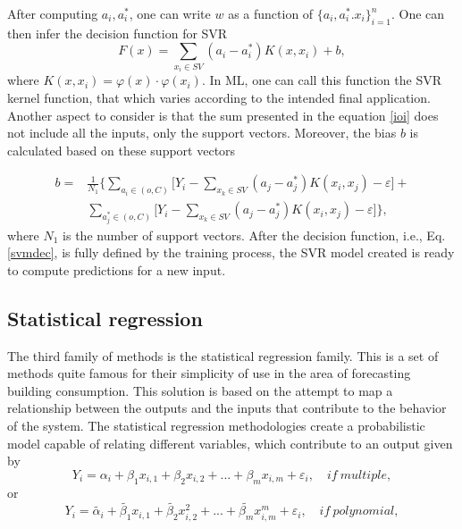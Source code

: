 After computing $a_i, a_i^*$, one can write $w$ as a function of $\{ a_i, a_i^*. x_i\}_{i=1}^n$. One can then infer the decision function for \ac{SVR}
\begin{equation}
      F(x) = \sum_{x_i \in SV} (a_i-a_i^*)K(x, x_i)+b , 
      \label{ioi}
\end{equation}
 where $K(x, x_i) = \varphi(x)\cdot\varphi(x_i)$. In \ac{ML}, one can call this function the \ac{SVR} kernel function, that which varies according to the intended final application. Another aspect to consider is that the sum presented in the equation \ref{ioi} does not include all the inputs, only the support vectors. Moreover, the bias $b$ is calculated based on these support vectors

\begin{equation}
\begin{split}
       b = & \frac{1}{N_1} \Bigg\{ \sum_{a_i \in (o,C)} \Bigg[ Y_i-\sum_{x_k\in SV}(a_j-a_j^*)K(x_i, x_j) - \varepsilon \Bigg] + \\
           & \sum_{a^*_j \in (o,C)}\Bigg[Y_i-\sum_{x_k\in SV}(a_j-a_j^*)K(x_i, x_j) - \varepsilon\Bigg] \Bigg\},
\end{split}
\end{equation}
 where $N_1$ is the number of support vectors. After the decision function, i.e., Eq.\ref{svmdec}, is fully defined by the training process, the \ac{SVR} model created is ready to compute predictions for a new input\cite{review2017}.
 

\subsection{Statistical regression}

The third family of methods is the statistical regression family. This is a set of methods quite famous for their simplicity of use in the area of forecasting building consumption. This solution is based on the attempt to map a relationship between the outputs and the inputs that contribute to the behavior of the system. The statistical regression methodologies create a probabilistic model capable of relating different variables, which contribute to an output given by 
\begin{equation}
       Y_i = \alpha_i + \beta_1 x_{i,1} + \beta_2 x_{i,2} + ... + \beta_m x_{i,m} + \varepsilon_i,\quad if \  multiple,
\label{multi}
\end{equation}
or
\begin{equation}
       Y_i = \tilde{\alpha_i} + \tilde{\beta_1} x_{i,1} + \tilde{\beta_2} x_{i,2}^2 + ... + \tilde{\beta_m} x_{i,m}^m + \varepsilon_i,\quad if \  polynomial,
\label{poly}
\end{equation}

